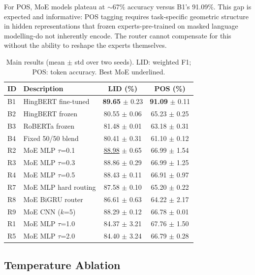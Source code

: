 \documentclass[conference]{IEEEtran}
\begin{document}
For POS, MoE models plateau at $\sim$67\% accuracy versus B1's 91.09\%. This gap is expected and informative: POS tagging requires task-specific geometric structure in hidden representations that frozen experts-pre-trained on masked language modelling-do not inherently encode. The router cannot compensate for this without the ability to reshape the experts themselves.

\begin{table}[t]
\centering
\caption{Main results (mean $\pm$ std over two seeds). LID: weighted F1; POS: token accuracy. Best MoE underlined.}
\label{tab:main}
\setlength{\tabcolsep}{4pt}
\begin{tabular}{llcc}
\toprule
\textbf{ID} & \textbf{Description} & \textbf{LID (\%)} & \textbf{POS (\%)} \\
\midrule
B1 & HingBERT fine-tuned       & \textbf{89.65} $\pm$ 0.23 & \textbf{91.09} $\pm$ 0.11 \\
B2 & HingBERT frozen           & 80.55 $\pm$ 0.06          & 65.23 $\pm$ 0.25 \\
B3 & RoBERTa frozen            & 81.48 $\pm$ 0.01          & 63.18 $\pm$ 0.31 \\
B4 & Fixed 50/50 blend         & 80.41 $\pm$ 0.31          & 61.10 $\pm$ 0.12 \\
\midrule
R2 & MoE MLP $\tau$=0.1        & \underline{88.98} $\pm$ 0.65 & 66.99 $\pm$ 1.54 \\
R3 & MoE MLP $\tau$=0.3        & 88.86 $\pm$ 0.29          & 66.99 $\pm$ 1.25 \\
R4 & MoE MLP $\tau$=0.5        & 88.43 $\pm$ 0.11          & 66.91 $\pm$ 0.97 \\
R7 & MoE MLP hard routing      & 87.58 $\pm$ 0.10          & 65.20 $\pm$ 0.22 \\
R8 & MoE BiGRU router          & 86.61 $\pm$ 0.63          & 64.22 $\pm$ 2.17 \\
R9 & MoE CNN ($k$=5)           & 88.29 $\pm$ 0.12          & 66.78 $\pm$ 0.01 \\
R1 & MoE MLP $\tau$=1.0        & 84.37 $\pm$ 3.21          & 67.76 $\pm$ 1.50 \\
R5 & MoE MLP $\tau$=2.0        & 84.40 $\pm$ 3.24          & 66.79 $\pm$ 0.28 \\
\bottomrule
\end{tabular}
\end{table}

\subsection{Temperature Ablation}
\end{document}
